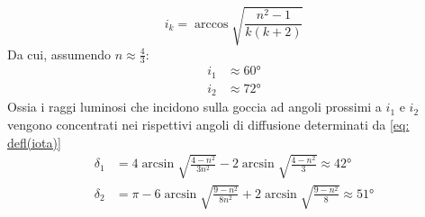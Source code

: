 \documentclass{report}[a4paper,11pt]
\begin{document}
\begin{equation}\label{eq:crit}
i_k = \arccos\sqrt{\frac{n^2-1}{k(k+2)}}
\end{equation}
Da cui, assumendo $n \approx \frac{4}{3}$:
\begin{align*}
i_1 &\approx 60 \si{\degree}\\
i_2 &\approx 72 \si{\degree}
\end{align*}
Ossia i raggi luminosi che incidono sulla goccia ad angoli prossimi a $i_1$ e $i_2$ vengono concentrati nei rispettivi angoli di diffusione determinati da \eqref{eq: defl(iota)}
\begin{align}
\delta_1 &= 4 \arcsin{\sqrt{\frac{4 - n^2}{3n^2}}} -2 \arcsin{\sqrt{\frac{4 - n^2}{3}}} \approx 42 \si{\degree}\\
\delta_2 &= \pi -6 \arcsin{\sqrt{\frac{9 - n^2}{8n^2}}} + 2\arcsin{\sqrt{\frac{9 - n^2}{8}}} \approx 51 \si{\degree}
\end{align}
\end{document}
